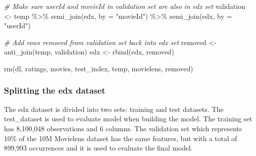 \documentclass[
]{article}
\newenvironment{Shaded}{\begin{snugshade}}{\end{snugshade}}
\newcommand{\AttributeTok}[1]{\textcolor[rgb]{0.77,0.63,0.00}{#1}}
\newcommand{\CommentTok}[1]{\textcolor[rgb]{0.56,0.35,0.01}{\textit{#1}}}
\newcommand{\ConstantTok}[1]{\textcolor[rgb]{0.00,0.00,0.00}{#1}}
\newcommand{\DecValTok}[1]{\textcolor[rgb]{0.00,0.00,0.81}{#1}}
\newcommand{\FloatTok}[1]{\textcolor[rgb]{0.00,0.00,0.81}{#1}}
\newcommand{\FunctionTok}[1]{\textcolor[rgb]{0.00,0.00,0.00}{#1}}
\newcommand{\NormalTok}[1]{#1}
\newcommand{\OtherTok}[1]{\textcolor[rgb]{0.56,0.35,0.01}{#1}}
\newcommand{\SpecialCharTok}[1]{\textcolor[rgb]{0.00,0.00,0.00}{#1}}
\newcommand{\StringTok}[1]{\textcolor[rgb]{0.31,0.60,0.02}{#1}}
\begin{document}
\begin{Shaded}
\begin{Highlighting}[]
\CommentTok{\# Make sure userId and movieId in validation set are also in edx set}
\NormalTok{validation }\OtherTok{\textless{}{-}}\NormalTok{ temp }\SpecialCharTok{\%\textgreater{}\%} 
  \FunctionTok{semi\_join}\NormalTok{(edx, }\AttributeTok{by =} \StringTok{"movieId"}\NormalTok{) }\SpecialCharTok{\%\textgreater{}\%}
  \FunctionTok{semi\_join}\NormalTok{(edx, }\AttributeTok{by =} \StringTok{"userId"}\NormalTok{)}

\CommentTok{\# Add rows removed from validation set back into edx set}
\NormalTok{removed }\OtherTok{\textless{}{-}} \FunctionTok{anti\_join}\NormalTok{(temp, validation)}
\NormalTok{edx }\OtherTok{\textless{}{-}} \FunctionTok{rbind}\NormalTok{(edx, removed)}

\FunctionTok{rm}\NormalTok{(dl, ratings, movies, test\_index, temp, movielens, removed)}
\end{Highlighting}
\end{Shaded}

\hypertarget{splitting-the-edx-dataset}{%
\subsubsection{Splitting the edx
dataset}\label{splitting-the-edx-dataset}}

The edx dataset is divided into two sets: training and test datasets.
The test\_dataset is used to evaluate model when building the model. The
training set has 8,100,048 observations and 6 columns. The validation
set which represents 10\% of the 10M Movielens dataset has the same
features, but with a total of 899,993 occurrences and it is used to
evaluate the final model.

\begin{Shaded}
\end{Shaded}
\end{document}
